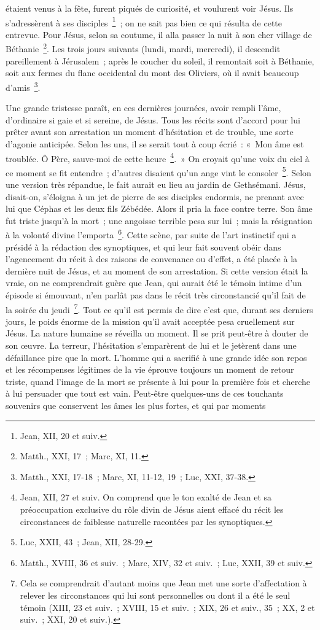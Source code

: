 \documentclass[french,twoside]{book} %
\begin{document}
étaient venus à la fête, furent piqués de curiosité, et voulurent voir Jésus. Ils s’adressèrent à ses disciples \footnote{Jean, XII, 20 et suiv.} ; on ne sait pas bien ce qui résulta de cette entrevue. Pour Jésus, selon sa coutume, il alla passer la nuit à son cher village de Béthanie \footnote{Matth., XXI, 17 ; Marc, XI, 11.}. Les trois jours suivants (lundi, mardi, mercredi), il descendit pareillement à Jérusalem ; après le coucher du soleil, il remontait soit à Béthanie, soit aux fermes du flanc occidental du mont des Oliviers, où il avait beaucoup d’amis \footnote{Matth., XXI, 17-18 ; Marc, XI, 11-12, 19 ; Luc, XXI, 37-38.}.\par
Une grande tristesse paraît, en ces dernières journées, avoir rempli l’âme, d’ordinaire si gaie et si sereine, de Jésus. Tous les récits sont d’accord pour lui prêter avant son arrestation un moment d’hésitation et de trouble, une sorte d’agonie anticipée. Selon les uns, il se serait tout à coup écrié : « Mon âme est troublée. Ô Père, sauve-moi de cette heure \footnote{Jean, XII, 27 et suiv. On comprend que le ton exalté de Jean et sa préoccupation exclusive du rôle divin de Jésus aient effacé du récit les circonstances de faiblesse naturelle racontées par les synoptiques.}. » On croyait qu’une voix du ciel à ce moment se fit entendre ; d’autres disaient qu’un ange vint le consoler \footnote{Luc, XXII, 43 ; Jean, XII, 28-29.}. Selon une version très répandue, le fait aurait eu lieu au jardin de Gethsémani. Jésus, disait-on, s’éloigna à un jet de pierre de ses disciples endormis, ne prenant avec lui que Céphas et les deux fils Zébédée. Alors il pria la face contre terre. Son âme fut triste jusqu’à la mort ; une angoisse terrible pesa sur lui ; mais la résignation à la volonté divine l’emporta \footnote{Matth., XVIII, 36 et suiv. ; Marc, XIV, 32 et suiv. ; Luc, XXII, 39 et suiv.}. Cette scène, par suite de l’art instinctif qui a présidé à la rédaction des synoptiques, et qui leur fait souvent obéir dans l’agencement du récit à des raisons de convenance ou d’effet, a été placée à la dernière nuit de Jésus, et au moment de son arrestation. Si cette version était la vraie, on ne comprendrait guère que Jean, qui aurait été le témoin intime d’un épisode si émouvant, n’en parlât pas dans le récit très circonstancié qu’il fait de la soirée du jeudi \footnote{Cela se comprendrait d’autant moins que Jean met une sorte d’affectation à relever les circonstances qui lui sont personnelles ou dont il a été le seul témoin (XIII, 23 et suiv. ; XVIII, 15 et suiv. ; XIX, 26 et suiv., 35 ; XX, 2 et suiv. ; XXI, 20 et suiv.).}. Tout ce qu’il est permis de dire c’est que, durant ses derniers jours, le poids énorme de la mission qu’il avait acceptée pesa cruellement sur Jésus. La nature humaine se réveilla un moment. Il se prit peut-être à douter de son œuvre. La terreur, l’hésitation s’emparèrent de lui et le jetèrent dans une défaillance pire que la mort. L’homme qui a sacrifié à une grande idée son repos et les récompenses légitimes de la vie éprouve toujours un moment de retour triste, quand l’image de la mort se présente à lui pour la première fois et cherche à lui persuader que tout est vain. Peut-être quelques-uns de ces touchants souvenirs que conservent les âmes les plus fortes, et qui par moments 
\end{document}
